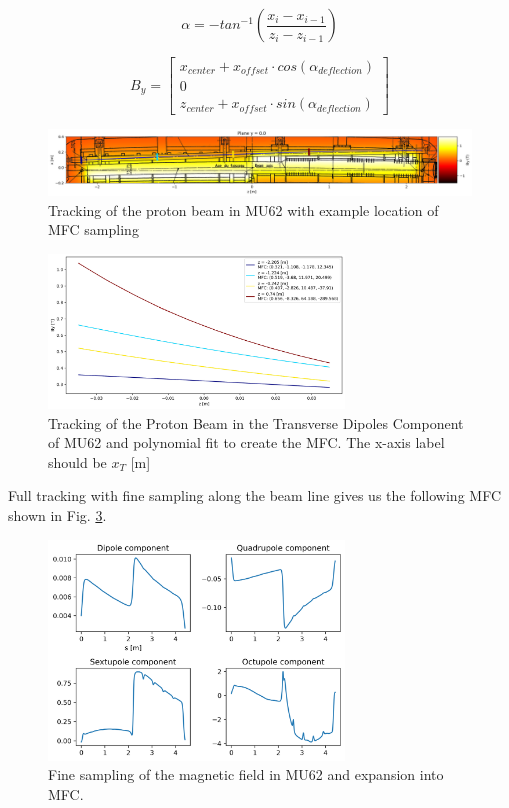 $$ \alpha = - tan^{-1}\left(\frac{ x_{i}-x_{i-1} } {z_{i}-z_{i-1}} \right)$$

$$ B_{y} = \begin{bmatrix}  
x_{center} + x_{offset}\cdot cos(\alpha_{deflection}) \\  
0 \\
z_{center} + x_{offset}\cdot sin(\alpha_{deflection})
\end{bmatrix} $$


\begin{figure}[H]
\centering
\includegraphics[width=1.0\textwidth]{02_Simulation/images/track_mu62_2.png}
\caption{Tracking of the proton beam in MU62 with example location of MFC sampling}
\label{fig:track_mu62_2}
\end{figure}

\begin{figure}[H]
\centering
\includegraphics[width=0.7\textwidth]{02_Simulation/images/track_mu62_2_mfc.png}
\caption{Tracking of the Proton Beam in the Transverse Dipoles Component of MU62 and polynomial fit to create the MFC. The x-axis label should be $x_{T}$ [m]}
\label{fig:track_mu62_2_mfc}
\end{figure}

Full tracking with fine sampling along the beam line gives us the following MFC shown in Fig. \ref{fig:mfc_mu62}.

\begin{figure}[H]
\centering
\includegraphics[width=0.7\textwidth]{02_Simulation/images/mfc_mu62.png}
\caption{Fine sampling of the magnetic field in MU62 and expansion into MFC.}
\label{fig:mfc_mu62}
\end{figure}


